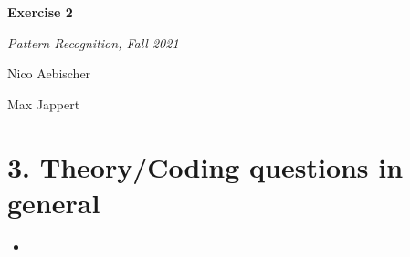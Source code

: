 \documentclass[11pt]{article}
\begin{document}
\begin{centering}
{\huge \bf Exercise 2} \smallskip

{\Large \em Pattern Recognition, Fall 2021

Nico Aebischer

Max Jappert

}
\end{centering}

\section*{3. Theory/Coding questions in general}
\begin{itemize}
	\item
\end{itemize}
\end{document}
